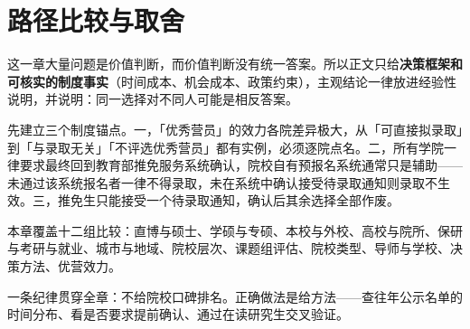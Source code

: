 \chapter{路径比较与取舍}
\label{ch18}
\begin{keybox}
这一章大量问题是价值判断，而价值判断没有统一答案。所以正文只给\textbf{决策框架和可核实的制度事实}（时间成本、机会成本、政策约束），主观结论一律放进经验性说明，并说明：同一选择对不同人可能是相反答案。

先建立三个制度锚点。一，「优秀营员」的效力各院差异极大，从「可直接拟录取」到「与录取无关」「不评选优秀营员」都有实例，必须逐院点名。二，所有学院一律要求最终回到教育部推免服务系统确认，院校自有预报名系统通常只是辅助——未通过该系统报名者一律不得录取，未在系统中确认接受待录取通知则录取不生效。三，推免生只能接受一个待录取通知，确认后其余选择全部作废。

本章覆盖十二组比较：直博与硕士、学硕与专硕、本校与外校、高校与院所、保研与考研与就业、城市与地域、院校层次、课题组评估、院校类型、导师与学校、决策方法、优营效力。

一条纪律贯穿全章：不给院校口碑排名。正确做法是给方法——查往年公示名单的时间分布、看是否要求提前确认、通过在读研究生交叉验证。
\end{keybox}

